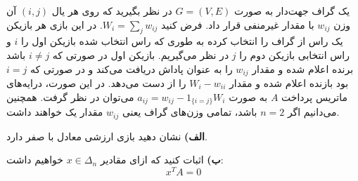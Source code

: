 یک گراف جهت‌دار به صورت
$G = (V,E)$
در نظر بگیرید که روی هر یال
$(i,j)$
آن وزن
$w_{ij}$
با مقدار غیرمنفی قرار داد. فرض کنید
$W_i = \sum_j w_{ij}$.
در این بازی هر بازیکن یک راس از گراف را انتخاب کرده به طوری که راس انتخاب شده بازیکن اول را 
$i$
و راس انتخابی بازیکن دوم را 
$j$
در نظر می‌گیریم. بازیکن اول در صورتی که
$i \ne j$
باشد برنده اعلام شده و مقدار 
$w_{ij}$
را به عنوان پاداش دریافت‌ می‌کند و در صورتی که 
$i = j$
بود بازنده اعلام شده و مقدار
$W_i - w_{ii}$
را از دست می‌دهد. در این صورت، درایه‌های ماتریس پرداخت
$A$
به صورت
$a_{ij} = w_{ij} - 1_{\{i=j\}} W_i$
می‌توان در نظر گرفت. همچنین می‌دانیم اگر
$n = 2$ 
باشد، تمامی وزن‌های گراف یعنی
$w_{ij}$
مقدار یک خواهند داشت.
\vspace*{10pt}

\textbf{الف)}
نشان دهید بازی ارزشی معادل با صفر دارد.
\vspace*{5pt}

\textbf{ب)}
اثبات کنید که ازای مقادیر 
$x \in \Delta_n$
خواهیم داشت:
\[
    x^T A = 0    
\]